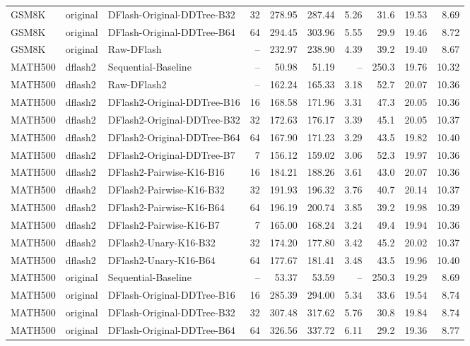 \begin{longtable}{lllrrrrrrr}
GSM8K & original & DFlash-Original-DDTree-B32 & 32 & 278.95 & 287.44 & 5.26 & 31.6 & 19.53 & 8.69 \\
GSM8K & original & DFlash-Original-DDTree-B64 & 64 & 294.45 & 303.96 & 5.55 & 29.9 & 19.46 & 8.72 \\
GSM8K & original & Raw-DFlash & -- & 232.97 & 238.90 & 4.39 & 39.2 & 19.40 & 8.67 \\
MATH500 & dflash2 & Sequential-Baseline & -- & 50.98 & 51.19 & -- & 250.3 & 19.76 & 10.32 \\
MATH500 & dflash2 & Raw-DFlash2 & -- & 162.24 & 165.33 & 3.18 & 52.7 & 20.07 & 10.36 \\
MATH500 & dflash2 & DFlash2-Original-DDTree-B16 & 16 & 168.58 & 171.96 & 3.31 & 47.3 & 20.05 & 10.36 \\
MATH500 & dflash2 & DFlash2-Original-DDTree-B32 & 32 & 172.63 & 176.17 & 3.39 & 45.1 & 20.05 & 10.37 \\
MATH500 & dflash2 & DFlash2-Original-DDTree-B64 & 64 & 167.90 & 171.23 & 3.29 & 43.5 & 19.82 & 10.40 \\
MATH500 & dflash2 & DFlash2-Original-DDTree-B7 & 7 & 156.12 & 159.02 & 3.06 & 52.3 & 19.97 & 10.36 \\
MATH500 & dflash2 & DFlash2-Pairwise-K16-B16 & 16 & 184.21 & 188.26 & 3.61 & 43.0 & 20.07 & 10.36 \\
MATH500 & dflash2 & DFlash2-Pairwise-K16-B32 & 32 & 191.93 & 196.32 & 3.76 & 40.7 & 20.14 & 10.37 \\
MATH500 & dflash2 & DFlash2-Pairwise-K16-B64 & 64 & 196.19 & 200.74 & 3.85 & 39.2 & 19.98 & 10.39 \\
MATH500 & dflash2 & DFlash2-Pairwise-K16-B7 & 7 & 165.00 & 168.24 & 3.24 & 49.4 & 19.94 & 10.36 \\
MATH500 & dflash2 & DFlash2-Unary-K16-B32 & 32 & 174.20 & 177.80 & 3.42 & 45.2 & 20.02 & 10.37 \\
MATH500 & dflash2 & DFlash2-Unary-K16-B64 & 64 & 177.67 & 181.41 & 3.48 & 43.5 & 19.96 & 10.40 \\
MATH500 & original & Sequential-Baseline & -- & 53.37 & 53.59 & -- & 250.3 & 19.29 & 8.69 \\
MATH500 & original & DFlash-Original-DDTree-B16 & 16 & 285.39 & 294.00 & 5.34 & 33.6 & 19.54 & 8.74 \\
MATH500 & original & DFlash-Original-DDTree-B32 & 32 & 307.48 & 317.62 & 5.76 & 30.8 & 19.84 & 8.74 \\
MATH500 & original & DFlash-Original-DDTree-B64 & 64 & 326.56 & 337.72 & 6.11 & 29.2 & 19.36 & 8.77 \\

\end{longtable}
